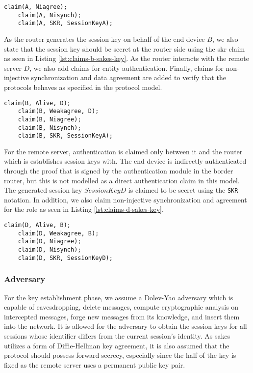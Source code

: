 \begin{lstlisting}[caption={Security claims for role A during key establishment in SAKES.}, label={lst:claims-a-sakes-key}]
	claim(A, Niagree);
	claim(A, Nisynch);
	claim(A, SKR, SessionKeyA);
\end{lstlisting}

As the router generates the session key on behalf of the end device $B$, we also state that the session key should be secret at the router side using the \gls{skr} claim as seen in Listing \ref{lst:claims-b-sakes-key}. As the router interacts with the remote server $D$, we also add claims for entity authentication. Finally, claims for non-injective synchronization and data agreement are added to verify that the protocols behaves as specified in the protocol model. \\

\begin{lstlisting}[caption={Security claims for role B during key establishment in SAKES.}, label={lst:claims-b-sakes-key}]
	claim(B, Alive, D);
	claim(B, Weakagree, D);
	claim(B, Niagree);
	claim(B, Nisynch);
	claim(B, SKR, SessionKeyA);
\end{lstlisting}


For the remote server, authentication is claimed only between it and the router which is establishes session keys with. The end device is indirectly authenticated through the proof that is signed by the authentication module in the border router, but this is not modelled as a direct authentication claim in this model. The generated session key $SessionKeyD$ is claimed to be secret using the \texttt{SKR} notation. In addition, we also claim non-injective synchronization and agreement for the role as seen in Listing \ref{lst:claims-d-sakes-key}.\\


\begin{lstlisting}[caption={Security claims for role D during key establishment in SAKES.}, label={lst:claims-d-sakes-key}]
	claim(D, Alive, B);
	claim(D, Weakagree, B);
	claim(D, Niagree);
	claim(D, Nisynch);
	claim(D, SKR, SessionKeyD);
\end{lstlisting}

\subsubsection{Adversary}

For the key establishment phase, we assume a Dolev-Yao adversary which is capable of eavesdropping, delete messages, compute cryptographic analysis on intercepted messages, forge new messages from its knowledge, and insert them into the network. It is allowed for the adversary to obtain the session keys for all sessions whose identifier differs from the current session's identity. As \gls{sakes} utilizes a form of Diffie-Hellman key agreement, it is also assumed that the protocol should possess forward secrecy, especially since the half of the key is fixed as the remote server uses a permanent public key pair.

